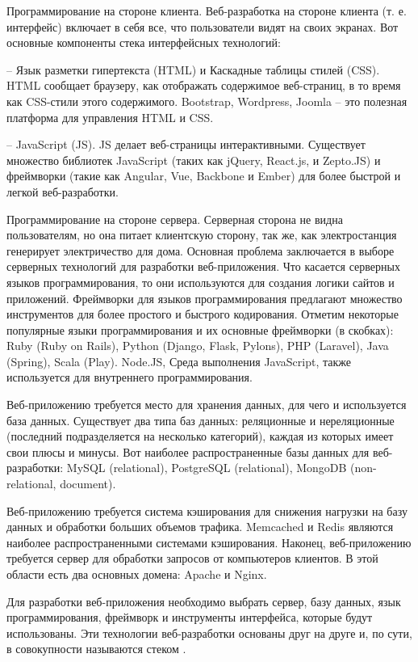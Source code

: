 Программирование на стороне клиента.
Веб-разработка на стороне клиента (т. е. интерфейс) включает в себя все, что пользователи видят на своих экранах. Вот основные компоненты стека интерфейсных технологий:

-- Язык разметки гипертекста (HTML) и Каскадные таблицы стилей (CSS).
HTML сообщает браузеру, как отображать содержимое веб-страниц, в то время как CSS-стили этого содержимого.
Bootstrap, Wordpress, Joomla – это полезная платформа для управления HTML и CSS.

-- JavaScript (JS). JS делает веб-страницы интерактивными.
Существует множество библиотек JavaScript (таких как jQuery, React.js, и Zepto.JS) и фреймворки (такие как Angular, Vue, Backbone и Ember) для более быстрой и легкой веб-разработки.

Программирование на стороне сервера.
Серверная сторона не видна пользователям, но она питает клиентскую сторону, так же, как электростанция генерирует электричество для дома.
Основная проблема заключается в выборе серверных технологий для разработки веб-приложения.
Что касается серверных языков программирования, то они используются для создания логики сайтов и приложений.
Фреймворки для языков программирования предлагают множество инструментов для более простого и быстрого кодирования.
Отметим некоторые популярные языки программирования и их основные фреймворки (в скобках): Ruby (Ruby on Rails), Python (Django, Flask, Pylons), PHP (Laravel), Java (Spring), Scala (Play).
Node.JS, Среда выполнения JavaScript, также используется для внутреннего программирования.

Веб-приложению требуется место для хранения данных, для чего и используется база данных.
Существует два типа баз данных: реляционные и нереляционные (последний подразделяется на несколько категорий), каждая из которых имеет свои плюсы и минусы.
Вот наиболее распространенные базы данных для веб-разработки: MySQL (relational), PostgreSQL (relational), MongoDB (non-relational, document).

Веб-приложению требуется система кэширования для снижения нагрузки на базу данных и обработки больших объемов трафика.
Memcached и Redis являются наиболее распространенными системами кэширования.
Наконец, веб-приложению требуется сервер для обработки запросов от компьютеров клиентов.
В этой области есть два основных домена: Apache и Nginx.

Для разработки веб-приложения необходимо выбрать сервер, базу данных, язык программирования, фреймворк и инструменты интерфейса, которые будут использованы.
Эти технологии веб-разработки основаны друг на друге и, по сути, в совокупности называются стеком \cite{ualiev-jebegenov-issledovanie-1}.

